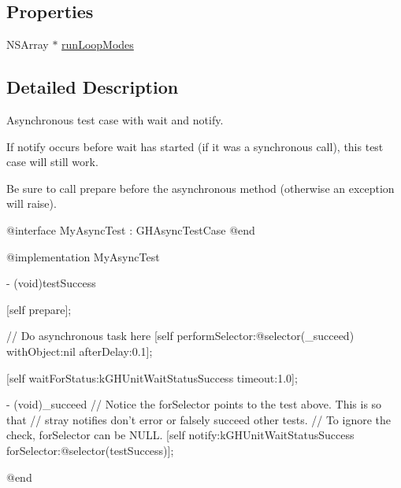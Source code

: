 \subsection*{\-Properties}
\begin{DoxyCompactItemize}
\item 
\-N\-S\-Array $\ast$ \hyperlink{interface_g_h_async_test_case_a89d630490dbfd03737fb398456d5ed16}{run\-Loop\-Modes}
\end{DoxyCompactItemize}


\subsection{\-Detailed \-Description}
\-Asynchronous test case with wait and notify.

\-If notify occurs before wait has started (if it was a synchronous call), this test case will still work.

\-Be sure to call prepare before the asynchronous method (otherwise an exception will raise).


\begin{DoxyCode}
 @interface MyAsyncTest : GHAsyncTestCase { }
 @end
 
 @implementation MyAsyncTest
 
 - (void)testSuccess {
   [self prepare];
   
   // Do asynchronous task here
   [self performSelector:@selector(_succeed) withObject:nil afterDelay:0.1];
   
   [self waitForStatus:kGHUnitWaitStatusSuccess timeout:1.0];
 }
 
 - (void)_succeed {
   // Notice the forSelector points to the test above. This is so that
   // stray notifies don't error or falsely succeed other tests.
   // To ignore the check, forSelector can be NULL.
   [self notify:kGHUnitWaitStatusSuccess forSelector:@selector(testSuccess)];
 }
 
 @end
\end{DoxyCode}
 

